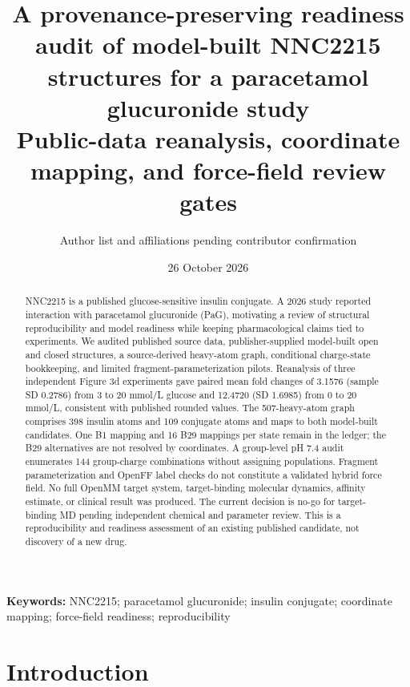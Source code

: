 \documentclass[11pt]{article}
\title{A provenance-preserving readiness audit of model-built NNC2215 structures for a paracetamol glucuronide study\\[0.4em]\large Public-data reanalysis, coordinate mapping, and force-field review gates}
\author{Author list and affiliations pending contributor confirmation}
\date{26 October 2026}
\begin{document}
\maketitle

\begin{center}\end{center}

\begin{abstract}

NNC2215 is a published glucose-sensitive insulin conjugate. A 2026 study reported interaction with paracetamol glucuronide (PaG), motivating a review of structural reproducibility and model readiness while keeping pharmacological claims tied to experiments. We audited published source data, publisher-supplied model-built open and closed structures, a source-derived heavy-atom graph, conditional charge-state bookkeeping, and limited fragment-parameterization pilots. Reanalysis of three independent Figure 3d experiments gave paired mean fold changes of 3.1576 (sample SD 0.2786) from 3 to 20 mmol/L glucose and 12.4720 (SD 1.6985) from 0 to 20 mmol/L, consistent with published rounded values. The 507-heavy-atom graph comprises 398 insulin atoms and 109 conjugate atoms and maps to both model-built candidates. One B1 mapping and 16 B29 mappings per state remain in the ledger; the B29 alternatives are not resolved by coordinates. A group-level pH 7.4 audit enumerates 144 group-charge combinations without assigning populations. Fragment parameterization and OpenFF label checks do not constitute a validated hybrid force field. No full OpenMM target system, target-binding molecular dynamics, affinity estimate, or clinical result was produced. The current decision is no-go for target-binding MD pending independent chemical and parameter review. This is a reproducibility and readiness assessment of an existing published candidate, not discovery of a new drug.

\end{abstract}

\textbf{Keywords:} NNC2215; paracetamol glucuronide; insulin conjugate; coordinate mapping; force-field readiness; reproducibility

\bigskip

\section{Introduction}
\end{document}
